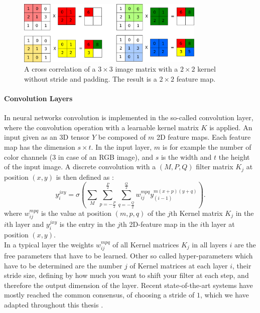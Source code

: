 \begin{figure}
	\centering
    	\includegraphics[width=0.8\textwidth]{imgs/convolution.png} 
    \caption{A cross correlation of a $3\times3$ image matrix with a $2\times2$ kernel without stride and padding. The result is a $2\times2$ feature map.}
	\label{fig:conv}
\end{figure}

\paragraph{Convolution Layers} \label{c:convlayers}

In neural networks convolution is implemented in the so-called convolution layer, where the convolution operation with a learnable kernel matrix $K$ is applied. An input given as an 3D tensor $Y$ be composed of $m$ 2D feature maps. Each feature map has the dimension $s \times t$. In the input layer, $m$ is for example the number of color channels (3 in case of an RGB image), and $s$ is the width and $t$ the height of the input image. A discrete convolution with a $(M , P , Q)$ filter matrix $K_j$ at position $(x,y)$ is then defined as : 
\[
y_{i}^{jxy} = \sigma(\sum_M \sum_{p=-\frac{P}{2}}^{\frac{P}{2}} \sum_{q=-\frac{Q}{2}}^{\frac{Q}{2}} w_{ij}^{mpq} y_{(i-1)}^{m(x+p)(y+q)}) .
\]
where $w_{ij}^{mpq}$ is the value at position $(m,p,q)$ of the $j$th Kernel matrix $K_j$ in the $i$th layer and $y_{i}^{jxy}$ is the entry in the $j$th 2D-feature map in the $i$th layer at position $(x, y)$.\\
In a typical layer the weights $w_{ij}^{mpq}$ of all Kernel matrices $K_j$ in all layers $i$ are the free parameters that have to be learned. Other so called hyper-parameters which have to be determined are the number $j$ of Kernel matrices at each layer $i$, their stride size, defining by how much you want to shift your filter at each step, and therefore the output dimension of the layer.
Recent state-of-the-art systems have mostly reached the common consensus, of choosing a stride of $1$, which we have adapted throughout this thesis \cite{simonyan2014very}.



